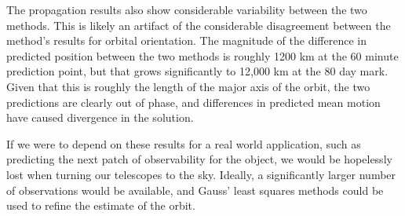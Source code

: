 \documentclass[11pt,twoside,letterpaper]{article}
\begin{document}
  The propagation results also show considerable variability between
  the two methods. This is likely an artifact of the considerable
  disagreement between the method's results for orbital
  orientation. The magnitude of the difference in predicted position
  between the two methods is roughly 1200 km at the 60 minute
  prediction point, but that grows significantly to 12,000 km at the
  80 day mark. Given that this is roughly the length of the major axis
  of the orbit, the two predictions are clearly out of phase, and
  differences in predicted mean motion have caused divergence in the
  solution.

  If we were to depend on these results for a real world application,
  such as predicting the next patch of observability for the object,
  we would be hopelessly lost when turning our telescopes to the
  sky. Ideally, a significantly larger number of observations would be
  available, and Gauss' least squares methods could be used to refine
  the estimate of the orbit.   
  
  {}
  
\end{document}
